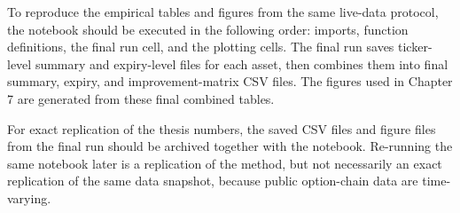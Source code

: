 \documentclass[11pt,a4paper]{report}
\begin{document}
To reproduce the empirical tables and figures from the same live-data protocol, the notebook should be executed in the following order: imports, function definitions, the final run cell, and the plotting cells. The final run saves ticker-level summary and expiry-level files for each asset, then combines them into final summary, expiry, and improvement-matrix CSV files. The figures used in Chapter 7 are generated from these final combined tables.

For exact replication of the thesis numbers, the saved CSV files and figure files from the final run should be archived together with the notebook. Re-running the same notebook later is a replication of the method, but not necessarily an exact replication of the same data snapshot, because public option-chain data are time-varying.
\end{document}
